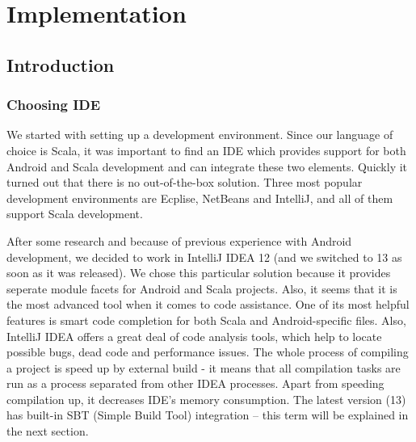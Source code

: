 %
%
%
%
%

\chapter{Implementation}
\label{chap:implementation}

\section{Introduction}
\label{sec:impl-intro}

\subsection{Choosing IDE}
\label{subsec:choosing-ide}
We started with setting up a development environment. Since our language of choice is Scala, it was important to find an IDE which provides support for both Android and Scala development and can integrate these two elements. Quickly it turned out that there is no out-of-the-box solution. Three most popular development environments are Ecplise, NetBeans and IntelliJ, and all of them support Scala development. 

After some research and because of previous experience with Android development, we decided to work in IntelliJ IDEA 12 (and we switched to 13 as soon as it was released). We chose this particular solution because it provides seperate module facets for Android and Scala projects\cite{Steingress:2011:AndroidScala}. Also, it seems that it is the most advanced tool when it comes to code assistance. One of its most helpful features is smart code completion for both Scala and Android-specific files\cite{Steingress:2011:AndroidScala}. Also, IntelliJ IDEA offers a great deal of code analysis tools, which help to locate possible bugs, dead code and performance issues. The whole process of compiling a project is speed up by external build - it means that all compilation tasks are run as a process separated from other IDEA processes. Apart from speeding compilation up, it decreases IDE's memory consumption\cite{Fatin:2012:NewWay}. The latest version (13)  has built-in SBT (Simple Build Tool) integration -- this term will be explained in the next section. 

